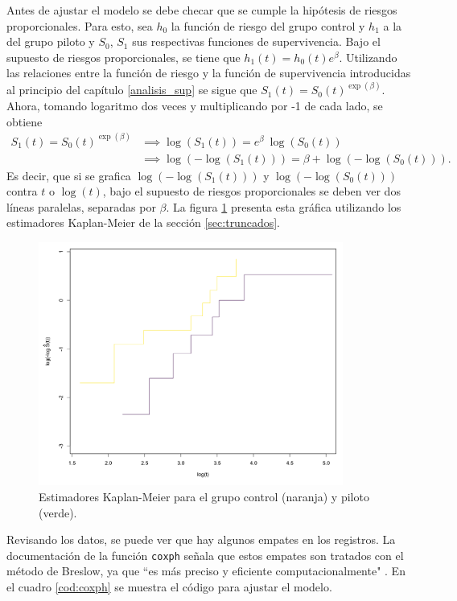 \documentclass[11pt,a4paper]{article}
\begin{document}
Antes de ajustar el modelo se debe checar que se cumple la hipótesis de riesgos proporcionales. Para esto, sea $h_0$  la función de riesgo del grupo control y $h_1$ a la del grupo piloto y $S_0$, $S_1$ sus respectivas funciones de supervivencia. Bajo el supuesto de riesgos proporcionales, se tiene que $h_1(t) = h_0(t) e^\beta.$ Utilizando las relaciones entre la función de riesgo y la función de supervivencia introducidas al principio del capítulo \ref{analisis_sup} se sigue que $S_1(t) = S_0(t) ^ {\exp (\beta)}.$ Ahora, tomando logaritmo dos veces y multiplicando por -1 de cada lado, se obtiene
\begin{align*}
S_1(t) = S_0(t) ^ {\exp (\beta)} &\implies \log (S_1(t)) = e^\beta \ \log (S_0(t))\\
&\implies \log (-\log (S_1(t))) = \beta + \log (-\log (S_0(t))).
\end{align*}
Es decir, que si se grafica $\log (-\log (S_1(t)))$ y $\log (-\log (S_0(t)))$ contra $t$ o $\log (t)$, bajo el supuesto de riesgos proporcionales se deben ver dos líneas paralelas, separadas por $\beta$. La figura \ref{fig:coxph} presenta esta gráfica utilizando los estimadores Kaplan-Meier de la sección \ref{sec:truncados}.

\begin{figure}[htb]
\centering\includegraphics[width=10cm]{prop_haz_km.png}
\caption{Estimadores Kaplan-Meier para el grupo control (naranja) y piloto (verde). }
\label{fig:coxph}
\end{figure}

Revisando los datos, se puede ver que hay algunos empates en los registros. La documentación de la función \texttt{coxph} señala que estos empates son tratados con el método de Breslow, ya que ``es más preciso y eficiente computacionalmente" \citep{survival-book}. En el cuadro \ref{cod:coxph} se muestra el código para ajustar el modelo.
\end{document}
